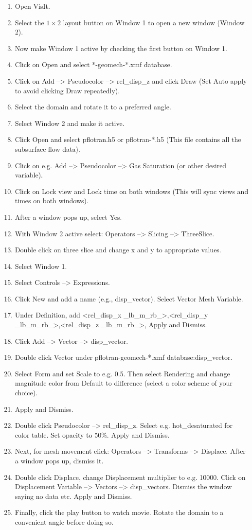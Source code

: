 \begin{itemize}
\begin{enumerate}
\item Open VisIt.
\item Select the $1\times 2$ layout button on Window 1 to open a new window (Window 2).
\item Now make Window 1 active by checking the first button on Window 1.
\item Click on Open and select *-geomech-*.xmf database.
\item Click on Add --> Pseudocolor --> rel\_disp\_z and click Draw (Set Auto apply to avoid clicking Draw repeatedly).
\item Select the domain and rotate it to a preferred angle.
\item Select Window 2 and make it active.
\item Click Open and select pflotran.h5 or pflotran-*.h5 (This file contains all the subsurface flow data).
\item Click on e.g. Add --> Pseudocolor --> Gas Saturation (or other desired variable).
\item Click on Lock view and Lock time on both windows (This will sync views and times on both windows).
\item After a window pops up, select Yes.
\item With Window 2 active select: Operators --> Slicing --> ThreeSlice.
\item Double click on three slice and change x and y to appropriate values.
\item Select Window 1.
\item Select Controls --> Expressions.
\item Click New and add a name (e.g., disp\_vector). Select Vector Mesh Variable.
\item Under Definition, add {<rel\_disp\_x \_lb\_m\_rb\_>,<rel\_disp\_y \_lb\_m\_rb\_>,<rel\_disp\_z \_lb\_m\_rb\_>}, Apply and Dismiss.
\item Click Add --> Vector --> disp\_vector.
\item Double click Vector under pflotran-geomech-*.xmf database:disp\_vector.
\item Select Form and set Scale to e.g. 0.5. Then select Rendering and change magnitude color from Default to difference (select a color scheme of your choice).
\item Apply and Dismiss.
\item Double click Pseudocolor --> rel\_disp\_z. Select e.g. hot\_desaturated for color table. Set opacity to 50\%. Apply and Dismiss.
\item Next, for mesh movement click: Operators --> Transforms --> Displace. After a window pops up, dismiss it.
\item Double click Displace, change Displacement multiplier to e.g. 10000. Click on Displacement Variable --> Vectors --> disp\_vectors. Dismiss the window saying no data etc. Apply and Dismiss.
\item Finally, click the play button to watch movie. Rotate the domain to a convenient angle before doing so.
\end{enumerate}
\end{itemize}

